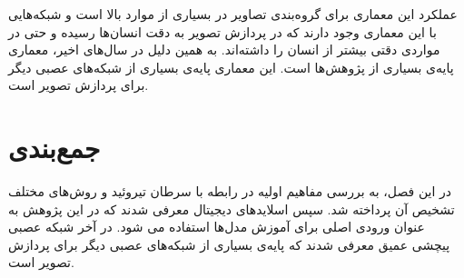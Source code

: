 عملکرد این معماری برای گروه‌بندی تصاویر در بسیاری از موارد بالا است و شبکه‌هایی با این معماری وجود دارند که در پردازش تصویر به دقت انسان‌ها رسیده و حتی در مواردی دقتی بیشتر از انسان را داشته‌اند. به همین دلیل در سال‌های اخیر، معماری پایه‌ی بسیاری از پژوهش‌ها است.
این معماری پایه‌ی بسیاری از شبکه‌های عصبی دیگر برای پردازش تصویر است.


\section{جمع‌بندی}
در این فصل، به بررسی مفاهیم اولیه در رابطه با سرطان تیروئید و روش‌های مختلف تشخیص آن پرداخته شد. سپس اسلاید‌های دیجیتال معرفی شدند که در این پژوهش به عنوان ورودی اصلی برای آموزش مدل‌ها استفاده می شود. در آخر شبکه عصبی پیچشی عمیق معرفی شدند که پایه‌ی بسیاری از شبکه‌های عصبی دیگر برای پردازش تصویر است.   
